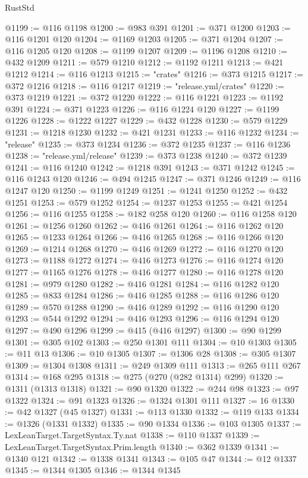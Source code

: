 \begin{lexlean}{RustStd}
\begin{coremodule}
@1199 := @116 @1198
@1200 := @983 @391
@1201 := @371 @1200
@1203 := @116 @1201 @120
@1204 := @1169 @1203
@1205 := @371 @1204
@1207 := @116 @1205 @120
@1208 := @1199 @1207
@1209 := @1196 @1208
@1210 := @432 @1209
@1211 := @579 @1210
@1212 := @1192 @1211
@1213 := @421 @1212
@1214 := @116 @1213
@1215 := "crates"
@1216 := @373 @1215
@1217 := @372 @1216
@1218 := @116 @1217
@1219 := "release.yml/crates"
@1220 := @373 @1219
@1221 := @372 @1220
@1222 := @116 @1221
@1223 := @1192 @391
@1224 := @371 @1223
@1226 := @116 @1224 @120
@1227 := @1199 @1226
@1228 := @1222 @1227
@1229 := @432 @1228
@1230 := @579 @1229
@1231 := @1218 @1230
@1232 := @421 @1231
@1233 := @116 @1232
@1234 := "release"
@1235 := @373 @1234
@1236 := @372 @1235
@1237 := @116 @1236
@1238 := "release.yml/release"
@1239 := @373 @1238
@1240 := @372 @1239
@1241 := @116 @1240
@1242 := @1218 @391
@1243 := @371 @1242
@1245 := @116 @1243 @120
@1246 := @494 @1245
@1247 := @371 @1246
@1249 := @116 @1247 @120
@1250 := @1199 @1249
@1251 := @1241 @1250
@1252 := @432 @1251
@1253 := @579 @1252
@1254 := @1237 @1253
@1255 := @421 @1254
@1256 := @116 @1255
@1258 := @182 @258 @120
@1260 := @116 @1258 @120
@1261 := @1256 @1260
@1262 := @416 @1261
@1264 := @116 @1262 @120
@1265 := @1233 @1264
@1266 := @416 @1265
@1268 := @116 @1266 @120
@1269 := @1214 @1268
@1270 := @416 @1269
@1272 := @116 @1270 @120
@1273 := @1188 @1272
@1274 := @416 @1273
@1276 := @116 @1274 @120
@1277 := @1165 @1276
@1278 := @416 @1277
@1280 := @116 @1278 @120
@1281 := @979 @1280
@1282 := @416 @1281
@1284 := @116 @1282 @120
@1285 := @833 @1284
@1286 := @416 @1285
@1288 := @116 @1286 @120
@1289 := @570 @1288
@1290 := @416 @1289
@1292 := @116 @1290 @120
@1293 := @544 @1292
@1294 := @416 @1293
@1296 := @116 @1294 @120
@1297 := @490 @1296
@1299 := @415 (@416 @1297)
@1300 := @90 @1299
@1301 := @305 @102
@1303 := @250 @1301 @111
@1304 := @10 @1303
@1305 := @11 @13
@1306 := @10 @1305
@1307 := @1306 @28
@1308 := @305 @1307
@1309 := @1304 @1308
@1311 := @249 @1309 @111
@1313 := @265 @111 @267
@1314 := @168 @295
@1318 := @275 (@270 (@282 @1314) @299)
@1320 := @1311 (@1313 @1318)
@1321 := @90 @1320
@1322 := @244 @98
@1323 := @97 @1322
@1324 := @91 @1323
@1326 := @1324 @1301 @111
@1327 := 16
@1330 := @42 @1327 (@45 @1327)
@1331 := @113 @1330
@1332 := @119 @133
@1334 := @1326 (@1331 @1332)
@1335 := @90 @1334
@1336 := @103 @1305
@1337 := LexLeanTarget.TargetSyntax.Ty.nat
@1338 := @110 @1337
@1339 := LexLeanTarget.TargetSyntax.Prim.length
@1340 := @362 @1339
@1341 := @1340 @121
@1342 := @1338 @1341
@1343 := @105 @47
@1344 := @12 @1337
@1345 := @1344 @1305
@1346 := @1344 @1345

\end{coremodule}
\end{lexlean}
